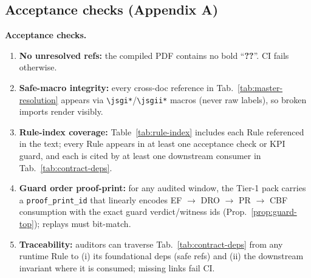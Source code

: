 \documentclass[10pt]{article}
\newenvironment{acceptchecks}{\par\medskip\noindent\textbf{Acceptance checks.}\begin{enumerate}[leftmargin=*]}{\end{enumerate}\medskip}
\newenvironment{acceptchecks}{\begin{mdframed}\textbf{Acceptance checks.}\begin{enumerate}[leftmargin=*]}{\end{enumerate}\end{mdframed}}
\begin{document}
\subsection{Acceptance checks (Appendix A)}\label{app:resolution-accept}
\begin{acceptchecks}
\item \textbf{No unresolved refs:} the compiled PDF contains no bold “\textbf{??}”. CI fails otherwise.
\item \textbf{Safe-macro integrity:} every cross-doc reference in Tab.~\ref{tab:master-resolution} appears via \texttt{\textbackslash jsgi*}/\texttt{\textbackslash jsgii*} macros (never raw labels), so broken imports render visibly.
\item \textbf{Rule-index coverage:} Table~\ref{tab:rule-index} includes each Rule referenced in the text; every Rule appears in at least one acceptance check or KPI guard, and each is cited by at least one downstream consumer in Tab.~\ref{tab:contract-deps}.
\item \textbf{Guard order proof-print:} for any audited window, the Tier-1 pack carries a \texttt{proof\_print\_id} that linearly encodes EF $\rightarrow$ DRO $\rightarrow$ PR $\rightarrow$ CBF consumption with the exact guard verdict/witness ids (Prop.~\ref{prop:guard-top}); replays must bit-match.
\item \textbf{Traceability:} auditors can traverse Tab.~\ref{tab:contract-deps} from any runtime Rule to (i) its foundational deps (safe refs) and (ii) the downstream invariant where it is consumed; missing links fail CI.
\end{acceptchecks}
\end{document}
